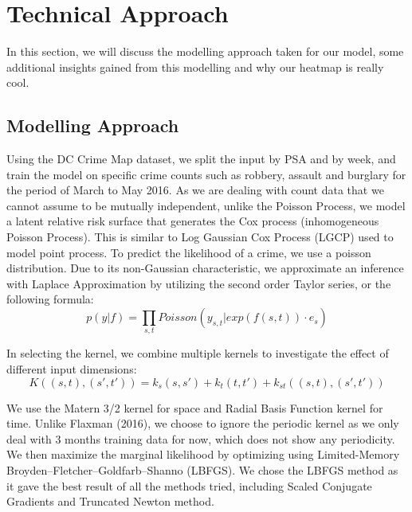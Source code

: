 \documentclass[a4paper, 10pt, conference]{ieeeconf}
\begin{document}
	\section{Technical Approach}
	
	In this section, we will discuss the modelling approach taken for our model, some additional insights gained from this modelling and why our heatmap is really cool.
	
	\subsection{Modelling Approach}
	Using the DC Crime Map dataset, we split the input by PSA and by week, and train the model on specific crime counts such as robbery, assault and burglary for the period of March to May 2016. 
	As we are dealing with count data that we cannot assume to be mutually independent, unlike the Poisson Process, we model a latent relative risk surface that generates the Cox process (inhomogeneous Poisson Process).
	This is similar to Log Gaussian Cox Process (LGCP) used to model point process.
	To predict the likelihood of a crime, we use a poisson distribution. Due to its non-Gaussian characteristic, we approximate an inference with Laplace Approximation by utilizing the second order Taylor series, or the following formula:
	\[p(y|f) = \prod_{s,t}Poisson(y_{s,t}|exp(f(s,t))\cdot e_s)\]

	In selecting the kernel, we combine multiple kernels to investigate the effect of different input dimensions:
	\[K((s,t),(s',t')) = k_s(s,s')+k_t(t,t')+k_{st}((s,t),(s',t'))\]

	We use the Matern 3/2 kernel for space and Radial Basis Function kernel for time.
	Unlike Flaxman (2016), we choose to ignore the periodic kernel as we only deal with 3 months training data for now, which does not show any periodicity.
	We then maximize the marginal likelihood by optimizing using Limited-Memory Broyden–Fletcher–Goldfarb–Shanno (LBFGS).
	We chose the LBFGS method as it gave the best result of all the methods tried, including Scaled Conjugate Gradients and Truncated Newton method.
	
\end{document}
